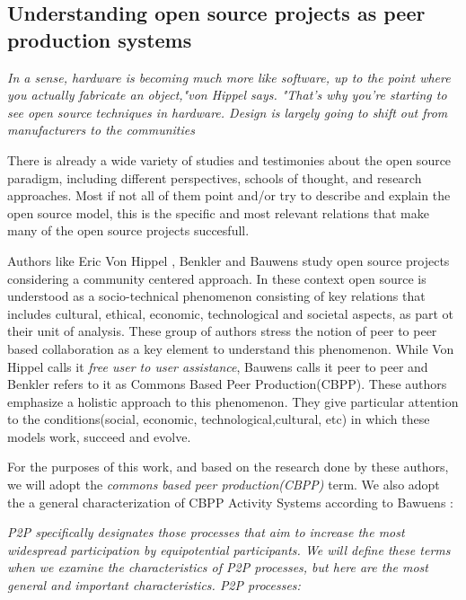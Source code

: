 \documentclass{ICED-Paper}%
\begin{document}
\subsection{Understanding open source projects as peer production systems}
\emph{In a sense, hardware is becoming much more like software, up to the point where you actually fabricate an object,"von Hippel says. "That's why you're starting to see open source techniques in hardware. Design is largely going to shift out from manufacturers to the communities}\cite{OH_works?}
\bigskip

There is already a wide variety of studies and testimonies about the open source paradigm, including different perspectives, schools of thought, and research approaches. Most if not all of them point and/or try to describe and explain the open source model, this is the specific and most relevant relations that make many of the open source projects succesfull.

\bigskip

Authors like Eric Von Hippel \cite{hippel_2}, Benkler \cite{Benkler} and Bauwens \cite{p2pEconomy} study open source projects considering a community centered approach. In these context open source is understood as a socio-technical phenomenon consisting of key relations that includes cultural, ethical, economic, technological and societal aspects, as part ot their unit of analysis. These group of authors stress the notion of peer to peer based collaboration as a key element to understand this phenomenon. While Von Hippel calls it \emph{free user to user assistance}, Bauwens calls it peer to peer and Benkler refers to it as Commons Based Peer Production(CBPP). These authors emphasize a holistic approach to this phenomenon. They give particular attention to the conditions(social, economic, technological,cultural, etc) in which these models work, succeed and evolve.
\bigskip

For the purposes of this work, and based on the research done by these authors, we will adopt the \emph{commons based peer production(CBPP)} term. We also adopt the a general characterization of CBPP Activity Systems according to Bawuens \cite{p2pEconomy}:

\emph{P2P specifically designates those processes that aim to increase the most widespread participation by equipotential participants. We will define these terms when we examine the characteristics of P2P processes, but here are the most general and important characteristics.
P2P processes:}
\end{document}
